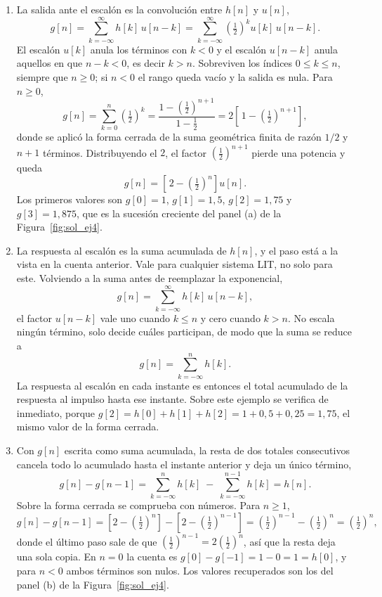 \documentclass[10pt,a4paper]{article}
\begin{document}
	\begin{enumerate}
		\item La salida ante el escalón es la convolución entre
		$h[n]$ y $u[n]$,
		\[
			g[n] = \sum_{k=-\infty}^{\infty} h[k]\,u[n-k]
			     = \sum_{k=-\infty}^{\infty} \left(\tfrac{1}{2}\right)^{\!k} u[k]\,u[n-k].
		\]
		El escalón $u[k]$ anula los términos con $k<0$ y el escalón $u[n-k]$ anula aquellos
		en que $n-k<0$, es decir $k>n$. Sobreviven los índices $0\le k\le n$, siempre que
		$n\ge 0$; si $n<0$ el rango queda vacío y la salida es nula. Para $n \ge 0$,
		\[
			g[n] = \sum_{k=0}^{n} \left(\tfrac{1}{2}\right)^{\!k}
			     = \frac{1-\left(\tfrac{1}{2}\right)^{n+1}}{1-\tfrac{1}{2}}
			     = 2\left[\,1-\left(\tfrac{1}{2}\right)^{\!n+1}\right],
		\]
		donde se aplicó la forma cerrada de la suma geométrica finita de razón $1/2$ y $n+1$
		términos. Distribuyendo el $2$, el factor $\left(\tfrac12\right)^{n+1}$ pierde una
		potencia y queda
		\[
			\boxed{\;g[n] = \left[\,2-\left(\tfrac{1}{2}\right)^{\!n}\right] u[n].\;}
		\]
		Los primeros valores son $g[0]=1$, $g[1]=1{,}5$, $g[2]=1{,}75$ y $g[3]=1{,}875$, que
		es la sucesión creciente del panel (a) de la Figura~\ref{fig:sol_ej4}.

		\item La respuesta al escalón es la suma acumulada de $h[n]$, y el paso está a la
		vista en la cuenta anterior. Vale para cualquier sistema LIT, no solo para este. Volviendo a la
		suma antes de reemplazar la exponencial,
		\[
			g[n] = \sum_{k=-\infty}^{\infty} h[k]\,u[n-k],
		\]
		el factor $u[n-k]$ vale uno cuando $k \le n$ y cero cuando $k>n$. No escala ningún
		término, solo decide cuáles participan, de modo que la suma se reduce a
		\[
			\boxed{\;g[n] = \sum_{k=-\infty}^{n} h[k].\;}
		\]
		La respuesta al escalón en cada instante es entonces el total acumulado de la
		respuesta al impulso hasta ese instante. Sobre este ejemplo se verifica de inmediato,
		porque $g[2]=h[0]+h[1]+h[2]=1+0{,}5+0{,}25=1{,}75$, el mismo valor de la forma
		cerrada.

		\item Con $g[n]$ escrita como suma
		acumulada, la resta de dos totales consecutivos cancela todo lo acumulado hasta el
		instante anterior y deja un único término,
		\[
			g[n]-g[n-1] = \sum_{k=-\infty}^{n} h[k] \;-\; \sum_{k=-\infty}^{n-1} h[k] = h[n].
		\]
		Sobre la forma cerrada se comprueba con números. Para $n \ge 1$,
		\[
			g[n]-g[n-1]
			= \left[2-\left(\tfrac{1}{2}\right)^{\!n}\right]
			- \left[2-\left(\tfrac{1}{2}\right)^{\!n-1}\right]
			= \left(\tfrac{1}{2}\right)^{\!n-1} - \left(\tfrac{1}{2}\right)^{\!n}
			= \left(\tfrac{1}{2}\right)^{\!n},
		\]
		donde el último paso sale de que $\left(\tfrac12\right)^{n-1}=2\left(\tfrac12\right)^{n}$,
		así que la resta deja una sola copia. En $n=0$ la cuenta es $g[0]-g[-1]=1-0=1=h[0]$,
		y para $n<0$ ambos términos son nulos. Los valores recuperados son los del panel (b)
		de la Figura~\ref{fig:sol_ej4}.


\end{enumerate}
\end{document}
